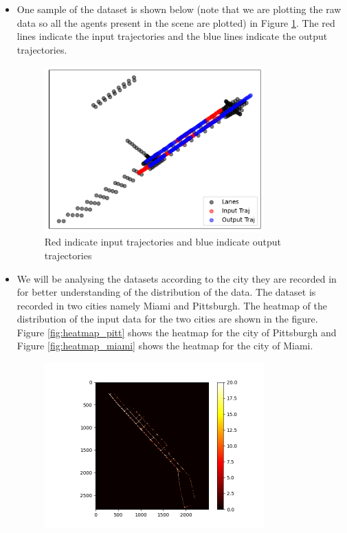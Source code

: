 \documentclass{article}
\begin{document}
\begin{itemize}
  \item One sample of the dataset is shown below (note that we are plotting the raw data so all the agents present in the scene are plotted) in Figure \ref{fig:sample}. The red lines indicate the input trajectories and the blue lines indicate the output trajectories.
  \begin{figure}[h]
    \centering
    \includegraphics[width=0.8\textwidth]{sample.png}
    \caption{Red indicate input trajectories and blue indicate output trajectories}
    \label{fig:sample}
  \end{figure}
  \item We will be analysing the datasets according to the city they are recorded in for better understanding of the distribution
  of the data. The dataset is recorded in two cities namely Miami and Pittsburgh. The heatmap of the distribution of the input
  data for the two cities are shown in the figure. Figure \ref{fig:heatmap_pitt} shows the heatmap for the city of Pittsburgh and Figure \ref{fig:heatmap_miami} shows the heatmap for the city of Miami.
\begin{figure}[h]
  \centering
  \includegraphics[width=0.8\textwidth]{pitt_inp.png}

\end{figure}
\end{itemize}
\end{document}
